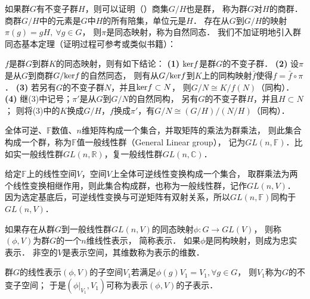 如果群$G$有不变子群$H$，则可以证明（\parencite[\S 1.3]{mengdj-cxds-1}）商集$G/H$也是群，
称为群$G$对$H$的{\heiti 商群}．商群$G/H$中的元素是$G$中$H$的所有陪集，单位元是$H$．
存在从$G$到$G/H$的映射$\boxed{\pi (g)= gH,\ \forall g\in G}$，
则$\pi$是同态映射，称为{\heiti 自然同态}．
我们不加证明地引入群同态基本定理（证明过程可参考\parencite[\S 1.7]{mengdj-cxds-1}或类似书籍）：

\begin{theorem}\label{chtop:thm_ghk}
    $f$是群$G$到群$K$的同态映射，则有如下结论：
    {\bfseries (1)} ${\rm ker}f$是群$G$的不变子群．
    {\bfseries (2)} 设$\pi$是从$G$到商群$G/{\rm ker}f$的自然同态，
    则有从$G/{\rm ker}f$到$K$上的同构映射$\bar{f}$使得$f=\bar{f}\circ \pi$．
    {\bfseries (3)} 若另有$G$的不变子群$N$，并且${\rm ker}f\subset N$，
    则$G/N \cong K/f(N)$（同构）．
    {\bfseries (4)}  继(3)中记号；$\pi'$是从$G$到$G/N$的自然同构，
    另有$G$的不变子群$H$，并且$H\subset N$；
    则将(3)中的$K$换成$G/H$，$f$换成$\pi'$，有$G/N \cong (G/H)/(N/H)$（同构）．
\end{theorem}

    
\begin{example}
    全体可逆、$\mathbb{F}$数值、$n$维矩阵构成一个集合，并取矩阵的乘法为群乘法，
    则此集合构成一个群，称为$\mathbb{F}$值{\heiti 一般线性群}（General Linear group），
    记为$GL(n,\mathbb{F})$．比如实一般线性群$GL(n,\mathbb{R})$，复一般线性群$GL(n,\mathbb{C})$．
\end{example}

\begin{example}
    给定$\mathbb{F}$上的线性空间$V$，空间$V$上全体可逆线性变换构成一个集合，
    取群乘法为两个线性变换相继作用，则此集合构成群，也称为{\heiti 一般线性群}，记作$GL(n,V)$．
    因为选定基底后，可逆线性变换与可逆矩阵有双射关系，所以$GL(n,\mathbb{F})$同构于$GL(n,V)$．
\end{example}


\begin{definition}\label{chtop:def_group_representation}
    如果存在从群$G$到一般线性群$GL(n,V)$的同态映射$\phi:G\to GL(V)$，
    则称$(\phi,V)$为群$G$的一个$n$维{\heiti 线性表示}，
    简称{\heiti 表示}． 如果$\phi$是同构映射，则成为{\heiti  忠实表示}．
    非空的$V$是表示空间，其维数称为表示的{\heiti 维数}．
\end{definition}
    
\begin{definition}
    群$G$的线性表示$(\phi,V)$的子空间$V_1$若满足$\phi(g)V_1 = V_1,\forall g\in G$，
    则$V_1$称为$G$的{\heiti 不变子空间}；
    于是$(\phi|_{V_1},V_1)$可称为表示$(\phi,V)$的{\heiti 子表示}．
\end{definition}


